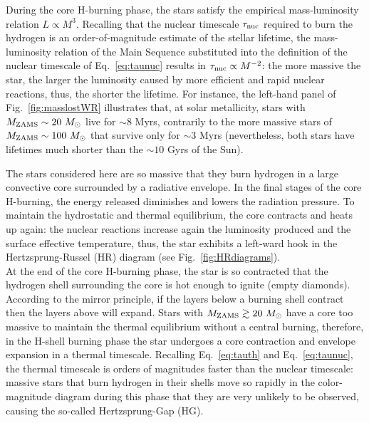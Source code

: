 \documentclass[a4paper,titlepage]{book}     	%
\newcommand{\sun}{\ensuremath{_\odot}}
\newcommand{\mzams}{M_\textup{ZAMS}}
\newcommand{\msun}{\ensuremath{M\sun}}
\begin{document}
During the core H-burning phase, the stars satisfy the empirical mass-luminosity relation $L \propto M^3$. Recalling that the nuclear timescale $\tau_{\rm nuc}$ required to burn the hydrogen is an order-of-magnitude estimate of the stellar lifetime, the mass-luminosity relation of the Main Sequence substituted into the definition of the nuclear timescale of Eq.\ \ref{eq:taunuc} results in $\tau_{\rm nuc} \propto M^{-2}$: the more massive the star, the larger the luminosity caused by more efficient and rapid nuclear reactions, thus, the shorter the lifetime. For instance, the left-hand panel of Fig.\ \ref{fig:masslostWR} illustrates that, at solar metallicity, stars with $\mzams \sim 20~\msun$ live for $\sim 8$ Myrs, contrarily to the more massive stars of $\mzams \sim 100~\msun$ that survive only for $\sim 3$ Myrs (nevertheless, both stars have lifetimes much shorter than the $\sim 10$ Gyrs of the Sun).

The stars considered here are so massive that they burn hydrogen in a large convective core surrounded by a radiative envelope. In the final stages of the core H-burning, the energy released diminishes and lowers the radiation pressure. To maintain the hydrostatic and thermal equilibrium, the core contracts and heats up again: the nuclear reactions increase again the luminosity produced and the surface effective temperature, thus, the star exhibits a left-ward hook in the Hertzsprung-Russel (HR) diagram (see Fig.\ \ref{fig:HRdiagrams}). \\

At the end of the core H-burning phase, the star is so contracted that the hydrogen shell surrounding the core is hot enough to ignite (empty diamonds). According to the mirror principle, if the layers below a burning shell contract then the layers above will expand. Stars with $\mzams \gtrsim 20~\msun$ have a core too massive to maintain the thermal equilibrium without a central burning, therefore, in the H-shell burning phase the star undergoes a core contraction and envelope expansion in a thermal timescale. Recalling Eq.\ \ref{eq:tauth} and Eq.\ \ref{eq:taunuc}, the thermal timescale is orders of magnitudes faster than the nuclear timescale: massive stars that burn hydrogen in their shells move so rapidly in the color-magnitude diagram during this phase that they are very unlikely to be observed, causing the so-called Hertzsprung-Gap (HG). \\
\end{document}
